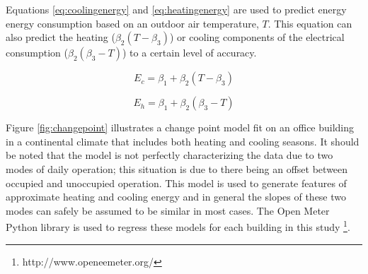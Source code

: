 Equations \ref{eq:coolingenergy} and \ref{eq:heatingenergy} are used to predict energy energy consumption based on an outdoor air temperature, $T$. This equation can also predict the heating ($\beta_2(T - \beta_3)$) or cooling components of the electrical consumption ($\beta_2(\beta_3 - T)$) to a certain level of accuracy. 

\begin{equation}
\label{eq:coolingenergy}
E_c = \beta_1 + \beta_2(T - \beta_3)
\end{equation}

\begin{equation}
\label{eq:heatingenergy}
E_h = \beta_1 + \beta_2(\beta_3 - T)
\end{equation}

Figure \ref{fig:changepoint} illustrates a change point model fit on an office building in a continental climate that includes both heating and cooling seasons. It should be noted that the model is not perfectly characterizing the data due to two modes of daily operation; this situation is due to there being an offset between occupied and unoccupied operation. This model is used to generate features of approximate heating and cooling energy and in general the slopes of these two modes can safely be assumed to be similar in most cases. The Open Meter Python library is used to regress these models for each building in this study \footnote{http://www.openeemeter.org/}.